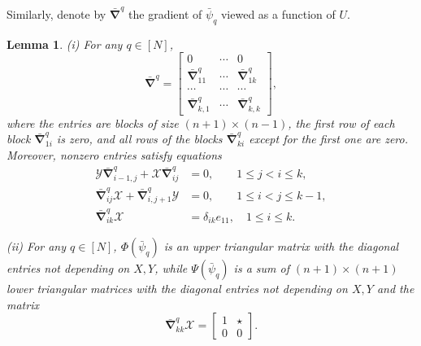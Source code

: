 \documentclass{amsart}
\newtheorem{lemma}[theorem]{Lemma}
\theoremstyle{definition}
\theoremstyle{remark}
\numberwithin{equation}{section}
\numberwithin{theorem}{section}
\begin{document}
Similarly, denote by $\bar{\boldsymbol\nabla}^q$ the gradient of $\bar {{\psi}}_q$ viewed as a function
of $U$. 

\begin{lemma}\label{gradpsi}
{\rm (i)} For any $q\in [N]$,
 \begin{equation}\label{aux11}
\bar{\boldsymbol\nabla}^q=
\left [\begin{array}{ccc} 0& \cdots & 0\\ 
\bar{\boldsymbol\nabla}^q_{11} & \cdots
&\bar{\boldsymbol\nabla}^q_{1k} \\ 
\cdots &\cdots &\cdots\\
\bar{\boldsymbol\nabla}^q_{k,1} & \cdots &\bar{\boldsymbol\nabla}^q_{k,k} 
\end{array}\right ],
\end{equation}
where the entries 
are blocks of size $(n+1)\times (n-1)$, the first row of each block $\bar{\boldsymbol\nabla}^q_{1i}$ is zero,
and all rows of the blocks $\bar{\boldsymbol\nabla}^q_{ki}$ except for the first one are zero.
Moreover, nonzero
entries satisfy  
equations
\begin{equation}\label{aux2}
 \begin{aligned}
{{\mathcal Y}} \bar{\boldsymbol\nabla}^q_{i-1,j} + {{\mathcal X}} \bar{\boldsymbol\nabla}^q_{i j} &= 0, \qquad
1\leq j<i\leq k, \\
\bar{\boldsymbol\nabla}^q_{i j}{{\mathcal X}} + \bar{\boldsymbol\nabla}^q_{i,j+1}{{\mathcal Y}}&=0, \qquad 1\leq i<j\leq k-1, \\
\bar{\boldsymbol\nabla}^q_{ik}{{\mathcal X}}&=\delta_{ik}e_{11}, \quad 1\leq i \leq k.
\end{aligned}
\end{equation}

{\rm (ii)} For any $q\in [N]$, ${\Phi}(\bar{{\psi}}_q)$ is an upper triangular matrix
with the diagonal
entries not depending on $X, Y$, while ${\Psi}(\bar{{\psi}}_q)$ is a sum of 
$(n+1)\times(n+1)$
lower triangular matrices with the diagonal entries not depending on $X, Y$ and the
matrix
$$
\bar{\boldsymbol\nabla}^q_{kk} {{\mathcal X}}=\left [\begin{array}{cc} 1 &  \star\\ 0 & 0
\end{array} \right ].
$$
\end{lemma}
\end{document}
